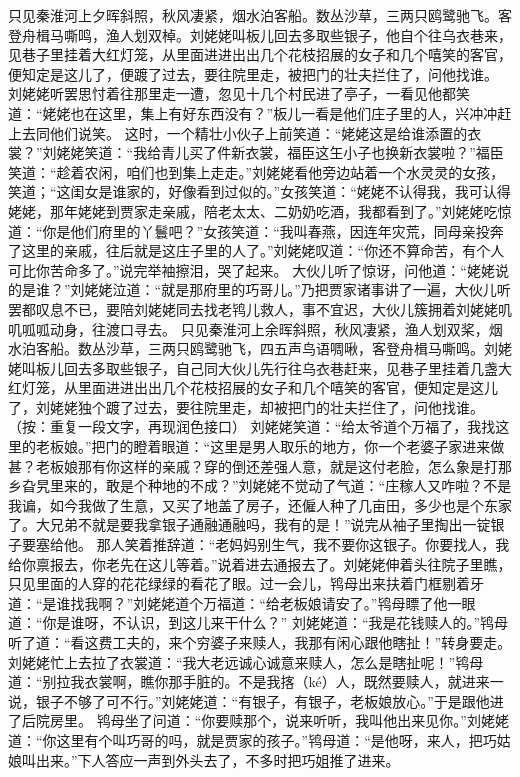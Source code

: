 \documentclass[12pt,oneside]{book}
\begin{document}
只见秦淮河上夕晖斜照，秋风凄紧，烟水泊客船。数丛沙草，三两只鸥鹭驰飞。客登舟楫马嘶鸣，渔人划双棹。刘姥姥叫板儿回去多取些银子，他自个往乌衣巷来，见巷子里挂着大红灯笼，从里面进进出出几个花枝招展的女子和几个嘻笑的客官，便知定是这儿了，便踱了过去，要往院里走，被把门的壮夫拦住了，问他找谁。
刘姥姥听罢思忖着往那里走一遭，忽见十几个村民进了亭子，一看见他都笑道：“姥姥也在这里，集上有好东西没有？”板儿一看是他们庄子里的人，兴冲冲赶上去同他们说笑。
这时，一个精壮小伙子上前笑道：“姥姥这是给谁添置的衣裳？”刘姥姥笑道：“我给青儿买了件新衣裳，福臣这玍小子也换新衣裳啦？”福臣笑道：“趁着农闲，咱们也到集上走走。”刘姥姥看他旁边站着一个水灵灵的女孩，笑道；“这闺女是谁家的，好像看到过似的。”女孩笑道：“姥姥不认得我，我可认得姥姥，那年姥姥到贾家走亲戚，陪老太太、二奶奶吃酒，我都看到了。”刘姥姥吃惊道：“你是他们府里的丫鬟吧？”女孩笑道：“我叫春燕，因连年灾荒，同母亲投奔了这里的亲戚，往后就是这庄子里的人了。”刘姥姥叹道：“你还不算命苦，有个人可比你苦命多了。”说完举袖擦泪，哭了起来。
大伙儿听了惊讶，问他道：“姥姥说的是谁？”刘姥姥泣道：“就是那府里的巧哥儿。”乃把贾家诸事讲了一遍，大伙儿听罢都叹息不已，要陪刘姥姥同去找老鸨儿救人，事不宜迟，大伙儿簇拥着刘姥姥叽叽呱呱动身，往渡口寻去。
只见秦淮河上余晖斜照，秋风凄紧，渔人划双桨，烟水泊客船。数丛沙草，三两只鸥鹭驰飞，四五声鸟语啁啾，客登舟楫马嘶鸣。刘姥姥叫板儿回去多取些银子，自己同大伙儿先行往乌衣巷赶来，见巷子里挂着几盏大红灯笼，从里面进进出出几个花枝招展的女子和几个嘻笑的客官，便知定是这儿了，刘姥姥独个踱了过去，要往院里走，却被把门的壮夫拦住了，问他找谁。
（按：重复一段文字，再现润色接口）
刘姥姥笑道：“给太爷道个万福了，我找这里的老板娘。”把门的瞪着眼道：“这里是男人取乐的地方，你一个老婆子家进来做甚？老板娘那有你这样的亲戚？穿的倒还差强人意，就是这付老脸，怎么象是打那乡旮旯里来的，敢是个种地的不成？”刘姥姥不觉动了气道：“庄稼人又咋啦？不是我谝，如今我做了生意，又买了地盖了房子，还僱人种了几亩田，多少也是个东家了。大兄弟不就是要我拿银子通融通融吗，我有的是！”说完从袖子里掏出一锭银子要塞给他。
那人笑着推辞道：“老妈妈别生气，我不要你这银子。你要找人，我给你禀报去，你老先在这儿等着。”说着进去通报去了。刘姥姥伸着头往院子里瞧，只见里面的人穿的花花绿绿的看花了眼。过一会儿，鸨母出来扶着门框剔着牙道：“是谁找我啊？”刘姥姥道个万福道：“给老板娘请安了。”鸨母瞟了他一眼道：“你是谁呀，不认识，到这儿来干什么？”
刘姥姥道：“我是花钱赎人的。”鸨母听了道：“看这费工夫的，来个穷婆子来赎人，我那有闲心跟他瞎扯！”转身要走。刘姥姥忙上去拉了衣裳道：“我大老远诚心诚意来赎人，怎么是瞎扯呢！”鸨母道：“别拉我衣裳啊，瞧你那手脏的。不是我揢（ké）人，既然要赎人，就进来一说，银子不够了可不行。”刘姥姥道：“有银子，有银子，老板娘放心。”于是跟他进了后院房里。
鸨母坐了问道：“你要赎那个，说来听听，我叫他出来见你。”刘姥姥道：“你这里有个叫巧哥的吗，就是贾家的孩子。”鸨母道：“是他呀，来人，把巧姑娘叫出来。”下人答应一声到外头去了，不多时把巧姐推了进来。
\end{document}
